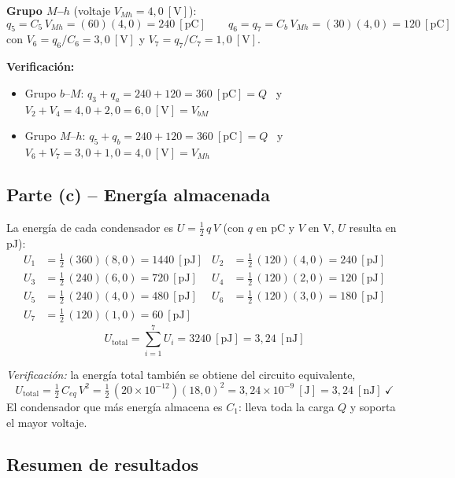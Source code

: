 \documentclass[12pt,letterpaper]{article}
\begin{document}
\medskip
\textbf{Grupo $M$--$h$} (voltaje $V_{Mh} = 4{,}0\ [\text{V}]$):
\[
    \boxed{q_5 = C_5\,V_{Mh} = (60)(4{,}0) = 240\ [\text{pC}]}
    \qquad
    \boxed{q_6 = q_7 = C_b\,V_{Mh} = (30)(4{,}0) = 120\ [\text{pC}]}
\]
con $V_6 = q_6/C_6 = 3{,}0\ [\text{V}]$ y $V_7 = q_7/C_7 = 1{,}0\ [\text{V}]$.

\medskip
\noindent\textbf{Verificaci\'on:}
\begin{itemize}\setlength\itemsep{1pt}
    \item Grupo $b$--$M$: $q_3 + q_a = 240 + 120 = 360\ [\text{pC}] = Q$ \ y \
          $V_2 + V_4 = 4{,}0 + 2{,}0 = 6{,}0\ [\text{V}] = V_{bM}$ \checkmark
    \item Grupo $M$--$h$: $q_5 + q_b = 240 + 120 = 360\ [\text{pC}] = Q$ \ y \
          $V_6 + V_7 = 3{,}0 + 1{,}0 = 4{,}0\ [\text{V}] = V_{Mh}$ \checkmark
\end{itemize}

\subsection*{Parte (c) -- Energ\'ia almacenada}

La energ\'ia de cada condensador es $U = \tfrac12\,q\,V$ (con $q$ en pC y $V$ en V, $U$ resulta en pJ):
\begin{align*}
    U_1 &= \tfrac12\,(360)(8{,}0) = 1440\ [\text{pJ}] &
    U_2 &= \tfrac12\,(120)(4{,}0) = 240\ [\text{pJ}]\\[2pt]
    U_3 &= \tfrac12\,(240)(6{,}0) = 720\ [\text{pJ}] &
    U_4 &= \tfrac12\,(120)(2{,}0) = 120\ [\text{pJ}]\\[2pt]
    U_5 &= \tfrac12\,(240)(4{,}0) = 480\ [\text{pJ}] &
    U_6 &= \tfrac12\,(120)(3{,}0) = 180\ [\text{pJ}]\\[2pt]
    U_7 &= \tfrac12\,(120)(1{,}0) = 60\ [\text{pJ}] & &
\end{align*}
\[
    \boxed{U_{\text{total}} = \sum_{i=1}^{7} U_i = 3240\ [\text{pJ}] = 3{,}24\ [\text{nJ}]}
\]

\noindent\textit{Verificaci\'on:} la energ\'ia total tambi\'en se obtiene del circuito equivalente,
\[
    U_{\text{total}} = \tfrac12\,C_{eq}\,V^2 = \tfrac12\,(20\times10^{-12})(18{,}0)^2
                     = 3{,}24\times10^{-9}\ [\text{J}] = 3{,}24\ [\text{nJ}]\ \checkmark
\]
El condensador que m\'as energ\'ia almacena es $C_1$: lleva toda la carga $Q$ y soporta el mayor
voltaje.

\subsection*{Resumen de resultados}
\end{document}
